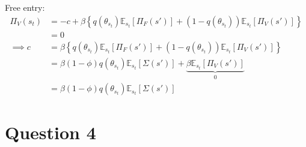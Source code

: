 \documentclass[11pt]{article}
\newcommand{\E}{\mathbb{E}}
\newcommand{\st}{_{s_t}}
\begin{document}
Free entry:
\begin{align*}
\Pi_V(s_t) &= -c + \beta \left\{ q(\theta\st)\E\st [\Pi_F(s')] + (1 - q(\theta\st)) \E\st[\Pi_V (s')]\right\}\\
&=0 \\
\implies c &=\beta \left\{ q(\theta\st)\E\st [\Pi_F(s')] + (1 - q(\theta\st)) \E\st[\Pi_V (s')]\right\}\\
&= \beta (1 - \phi) q(\theta\st)\E\st[\Sigma(s')] + \underbrace{\beta \E\st [\Pi_V(s')]}_0\\
&= \beta (1 - \phi) q(\theta\st)\E\st[\Sigma(s')]
\end{align*}
\newpage

\section{Question 4}
\label{sec:org27e8c00}
\end{document}
